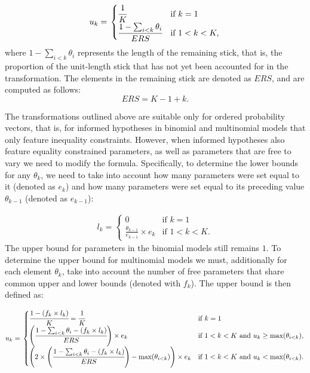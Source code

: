 \documentclass[
  english,
  man,floatsintext]{apa6}
\begin{document}
\begin{align}
\label{Eq:upperBound}
u_k = \left.
\begin{cases}
\cfrac{1}{K} & \text{if } k = 1 \\
\cfrac{1 - \sum_{i < k} \theta_i}{ERS} & \text{if } 1 < k < K,
\end{cases}
\right.
\end{align} where \(1 - \sum_{i < k} \theta_i\) represents the length of
the remaining stick, that is, the proportion of the unit-length stick
that has not yet been accounted for in the transformation. The elements
in the remaining stick are denoted as \(ERS\), and are computed as
follows: \[ERS = K - 1 + k.\]

The transformations outlined above are suitable only for ordered
probability vectors, that is, for informed hypotheses in binomial and
multinomial models that only feature inequality constraints. However,
when informed hypotheses also feature equality constrained parameters,
as well as parameters that are free to vary we need to modify the
formula. Specifically, to determine the lower bounds for any
\(\theta_k\), we need to take into account how many parameters were set
equal to it (denoted as \(e_k\)) and how many parameters were set equal
to its preceding value \(\theta_{k-1}\) (denoted as \(e_{k-1}\)):

\begin{align}
\label{Eq:lowerBoundAdjusted}
l_k = \left.
\begin{cases}
0 & \text{if } k = 1 \\
\frac{\theta_{k - 1}}{e_{k-1}} \times e_k & \text{if } 1 < k < K.
\end{cases}
\right.
\end{align} The upper bound for parameters in the binomial models still
remains \(1\). To determine the upper bound for multinomial models we
must, additionally for each element \(\theta_k\), take into account the
number of free parameters that share common upper and lower bounds
(denoted with \(f_k\)). The upper bound is then defined as:

\begin{align}
u_k = \left.
\begin{cases}
\cfrac{1 - (f_k \times l_k)}{K} = \cfrac{1}{K} & \text{if } k = 1 \\
\left( \cfrac{1 - \sum_{i < k} \theta_i - (f_k \times l_k)}{ERS} \right) \times e_k & \text{if } 1 < k < K \text{ and } u_k \geq \text{max}(\theta_{i < k}), \\
\left( 2 \times \left( \cfrac{1 - \sum_{i < k} \theta_i - (f_k \times l_k)}{ERS} \right) - \text{max}(\theta_{i < k}) \right)  \times e_k & \text{if } 1 < k < K \text{ and } u_k < \text{max}(\theta_{i < k}).
\end{cases}
\right.
\end{align}
\end{document}
